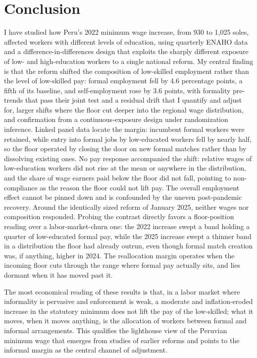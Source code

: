 \section{Conclusion}\label{sec:conclusion}

I have studied how Peru's 2022 minimum wage increase, from 930 to 1,025 soles, affected workers with different levels of education, using quarterly ENAHO data and a difference-in-differences design that exploits the sharply different exposure of low- and high-education workers to a single national reform. My central finding is that the reform shifted the composition of low-skilled employment rather than the level of low-skilled pay: formal employment fell by 4.6 percentage points, a fifth of its baseline, and self-employment rose by 3.6 points, with formality pre-trends that pass their joint test and a residual drift that I quantify and adjust for, larger shifts where the floor cut deeper into the regional wage distribution, and confirmation from a continuous-exposure design under randomization inference. Linked panel data locate the margin: incumbent formal workers were retained, while entry into formal jobs by low-educated workers fell by nearly half, so the floor operated by closing the door on new formal matches rather than by dissolving existing ones. No pay response accompanied the shift: relative wages of low-education workers did not rise at the mean or anywhere in the distribution, and the share of wage earners paid below the floor did not fall, pointing to non-compliance as the reason the floor could not lift pay. The overall employment effect cannot be pinned down and is confounded by the uneven post-pandemic recovery. Around the identically sized reform of January 2025, neither wages nor composition responded. Probing the contrast directly favors a floor-position reading over a labor-market-churn one: the 2022 increase swept a band holding a quarter of low-educated formal pay, while the 2025 increase swept a thinner band in a distribution the floor had already outrun, even though formal match creation was, if anything, higher in 2024. The reallocation margin operates when the incoming floor cuts through the range where formal pay actually sits, and lies dormant when it has moved past it.

The most economical reading of these results is that, in a labor market where informality is pervasive and enforcement is weak, a moderate and inflation-eroded increase in the statutory minimum does not lift the pay of the low-skilled; what it moves, when it moves anything, is the allocation of workers between formal and informal arrangements. This qualifies the lighthouse view of the Peruvian minimum wage that emerges from studies of earlier reforms and points to the informal margin as the central channel of adjustment.

